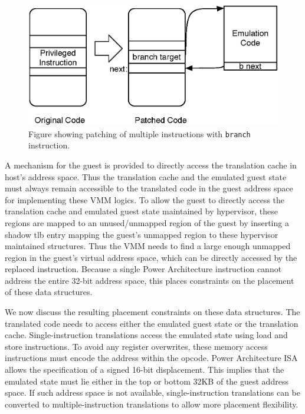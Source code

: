 \begin{figure}[!tb]
\centering
\includegraphics[scale=0.5]{txcache.eps}
\caption{\label{fig:txcache}Figure showing patching of multiple instructions with {\tt branch} instruction.}
\end{figure}

A mechanism for the guest is provided to directly access the translation cache in host’s address space. Thus the translation cache and the emulated guest state must always remain accessible to the translated code in the guest address space for implementing these VMM logics. To allow the guest to directly access the translation cache and emulated guest state maintained by hypervisor, these regions are mapped to an unused/unmapped region of the guest by inserting a shadow tlb entry mapping the guest's unmapped region to these hypervisor maintained structures. Thus the VMM needs to find a large enough unmapped region in the guest’s virtual address space, which can be directly accessed by the replaced instruction. Because a single Power Architecture instruction cannot address the entire 32-bit address space, this places constraints on the placement of these data structures.

We now discuss the resulting placement constraints on these data structures. The translated code needs to access either the emulated guest state or the translation cache.  Single-instruction translations access the emulated state using load and store instructions. To avoid any register overwrites, these memory access instructions must encode the address within the opcode. Power Architecture ISA allows the specification of a signed 16-bit displacement. This implies that the emulated state must lie either in the top or bottom 32KB of the guest address space. If such address space is not available, single-instruction translations can be converted to multiple-instruction translations to allow more placement flexibility.

